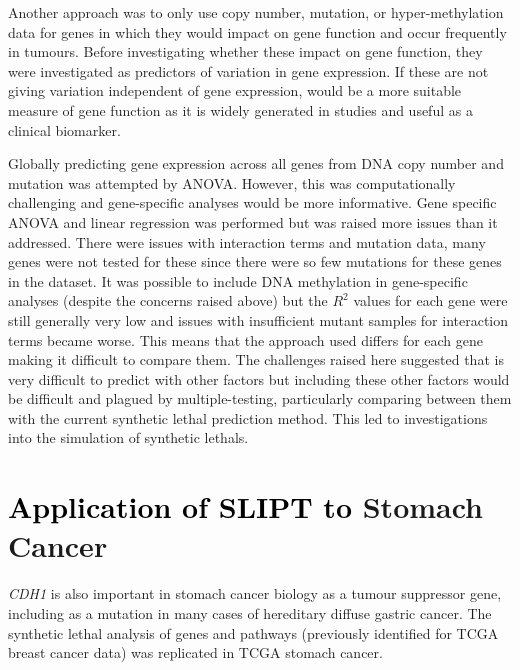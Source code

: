 Another approach was to only use copy number, \gls{mutation}, or hyper-methylation data for genes in which they would impact on gene function and occur frequently in tumours. Before investigating whether these impact on gene function, they were investigated as predictors of variation in \gls{gene expression}. If these are not giving variation independent of \gls{gene expression},  would be a more suitable measure of gene function as it is widely generated in studies and useful as a clinical biomarker.

Globally predicting \gls{gene expression} across all genes from \acrshort{DNA} copy number and  \gls{mutation} was attempted by \gls{ANOVA}. However, this was computationally challenging and gene-specific analyses would be more informative. Gene specific \gls{ANOVA} and linear regression was performed but was raised more issues than it addressed. There were issues with interaction terms and \gls{mutation} data, many genes were not tested for these since there were so few \glspl{mutation} for these genes in the dataset.  It was possible to include \acrshort{DNA} methylation in gene-specific analyses (despite the concerns raised above) but the $R^2$ values for each gene were still generally very low and issues with insufficient \gls{mutant} samples for interaction terms became worse. This means that the approach used differs for each gene making it difficult to compare them. The challenges raised here suggested that  is very difficult to predict with other factors but including these other factors would be difficult and plagued by multiple-testing, particularly comparing between them with the current \gls{synthetic lethal} prediction method. This led to investigations into the simulation of \glspl{synthetic lethal}.
\fi

\FloatBarrier

\section{\textcolor{black}{Application of SLIPT to } Stomach Cancer} \label{chapt3:stad_replication}

\textit{CDH1} is also important in stomach cancer biology as a  \gls{tumour suppressor} gene, including as a  \gls{mutation} in many cases of \gls{hereditary} diffuse gastric cancer. The \gls{synthetic lethal} analysis of genes and \glspl{pathway} (previously identified for \gls{TCGA} breast cancer data) was replicated in \gls{TCGA} stomach cancer. %

